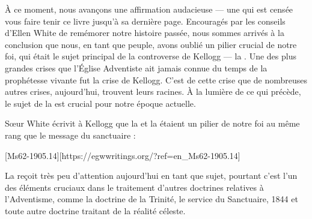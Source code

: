 À ce moment, nous avançons une affirmation audacieuse — une qui est censée vous faire tenir ce livre jusqu'à sa dernière page. Encouragés par les conseils d'Ellen White de remémorer notre histoire passée, nous sommes arrivés à la conclusion que nous, en tant que peuple, avons oublié un pilier crucial de notre foi, qui était le sujet principal de la controverse de Kellogg — la . Une des plus grandes crises que l'Église Adventiste ait jamais connue du temps de la prophétesse vivante fut la crise de Kellogg. C'est de cette crise que de nombreuses autres crises, aujourd'hui, trouvent leurs racines. À la lumière de ce qui précède, le sujet de la  est crucial pour notre époque actuelle.

Sœur White écrivit à Kellogg que la  et la  étaient un pilier de notre foi au même rang que le message du sanctuaire :

[Ms62-1905.14][https://egwwritings.org/?ref=en\_Ms62-1905.14]

La  reçoit très peu d'attention aujourd'hui en tant que sujet, pourtant c'est l'un des éléments cruciaux dans le traitement d'autres doctrines relatives à l'Adventisme, comme la doctrine de la Trinité, le service du Sanctuaire, 1844 et toute autre doctrine traitant de la réalité céleste.

